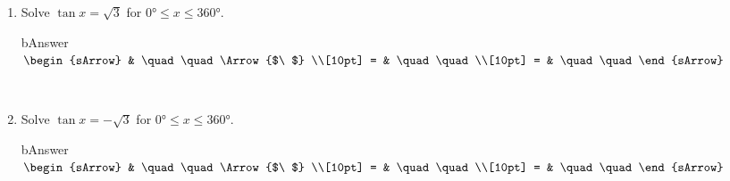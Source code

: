 \clearpage\noindent%
\begin{enumerate}[resume]
  \item Solve $\tan{x}=\sqrt{3}$ for $  0\si{\degree} \leqslant x \leqslant 360\si{\degree}$.
      \begin{envOut}[equal height group=A-Rev-1]{bAnswer}
	       $\begin{sArrow}
	             & \quad\quad       \Arrow{$\ $} \\[10pt]
               = & \quad\quad               \\[10pt]      
			   = & \quad\quad  
	        \end{sArrow}$
      \end{envOut}
	  \begin{shortsolution}  
	     $ \quad \quad \quad \quad$
 	  \end{shortsolution}

  \item Solve $\tan{x}=-\sqrt{3}$ for $  0\si{\degree} \leqslant x \leqslant 360\si{\degree}$.
      \begin{envOut}[equal height group=A-Rev-1]{bAnswer}
	       $\begin{sArrow}
	             & \quad\quad       \Arrow{$\ $} \\[10pt]
               = & \quad\quad               \\[10pt]      
			   = & \quad\quad  
	        \end{sArrow}$
      \end{envOut}
	  \begin{shortsolution}  
	     $ \quad \quad \quad \quad$
 	  \end{shortsolution}
\end{enumerate}

